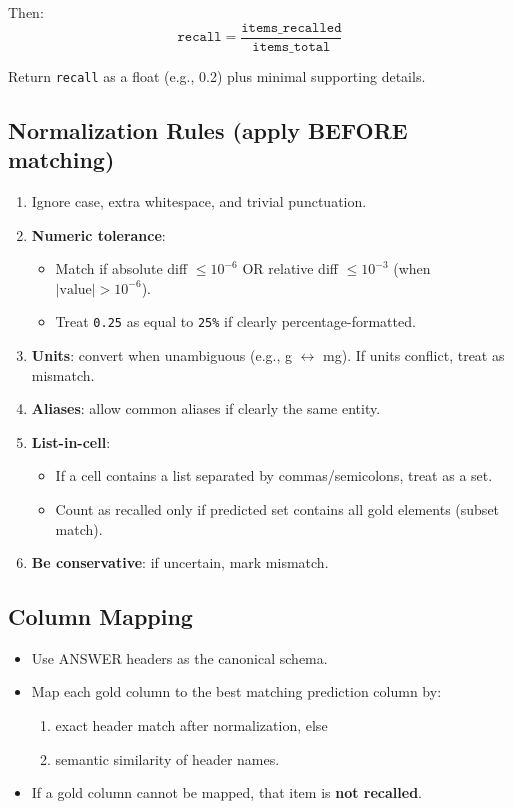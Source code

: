 \begin{tcolorbox}
Then:
\[ \texttt{recall} = \frac{\texttt{items\_recalled}}{\texttt{items\_total}} \]

Return \texttt{recall} as a float (e.g., 0.2) plus minimal supporting details.

\subsection*{Normalization Rules (apply BEFORE matching)}

\begin{enumerate}
    \item Ignore case, extra whitespace, and trivial punctuation.
    \item \textbf{Numeric tolerance}:
    \begin{itemize}
        \item Match if absolute diff $\le 10^{-6}$ OR relative diff $\le 10^{-3}$ (when $|\text{value}| > 10^{-6}$).
        \item Treat \texttt{0.25} as equal to \texttt{25\%} if clearly percentage-formatted.
    \end{itemize}
    \item \textbf{Units}: convert when unambiguous (e.g., g $\leftrightarrow$ mg). If units conflict, treat as mismatch.
    \item \textbf{Aliases}: allow common aliases if clearly the same entity.
    \item \textbf{List-in-cell}:
    \begin{itemize}
        \item If a cell contains a list separated by commas/semicolons, treat as a set.
        \item Count as recalled only if predicted set contains all gold elements (subset match).
    \end{itemize}
    \item \textbf{Be conservative}: if uncertain, mark mismatch.
\end{enumerate}

\subsection*{Column Mapping}

\begin{itemize}
    \item Use ANSWER headers as the canonical schema.
    \item Map each gold column to the best matching prediction column by:
    \begin{enumerate}
        \item exact header match after normalization, else
        \item semantic similarity of header names.
    \end{enumerate}
    \item If a gold column cannot be mapped, that item is \textbf{not recalled}.
\end{itemize}


\end{tcolorbox}
